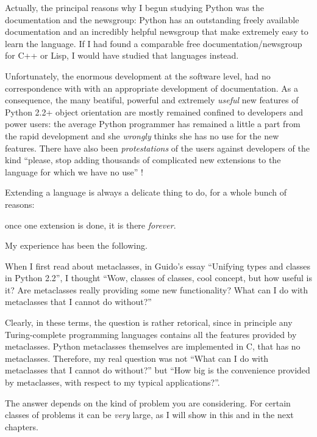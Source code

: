 \documentclass[10pt,english]{article}
\begin{document}
Actually, the principal reasons why I begun studying 
Python was the documentation and the newsgroup: Python has an outstanding 
freely available documentation and an incredibly helpful newsgroup that
make extremely easy to learn the language. If I had found a comparable 
free documentation/newsgroup for C++ or Lisp, I would have studied that
languages instead.

Unfortunately, the enormous development at the software level, had no
correspondence with with an appropriate development of documentation.
As a consequence, the many beatiful, powerful and extremely \emph{useful}
new features of Python 2.2+ object orientation are mostly remained
confined to developers and power users: the average Python programmer
has remained a little a part from the rapid development and she
\emph{wrongly} thinks she has no use for the new features. There have
also been \emph{protestations} of the users against developers of the
kind ``please, stop adding thousands of complicated new extensions
to the language for which we have no use'' !

Extending a language is always a delicate thing to do, for a whole
bunch of reasons:
\begin{list}{.}
{
\setlength{\rightmargin}{\leftmargin}
}
\item {} 
once one extension is done, it is there \emph{forever}.

\end{list}

My experience has been the following.

When I first read about metaclasses, in Guido's essay
``Unifying types and classes in Python 2.2'', I thought ``Wow,
classes of classes, cool concept, but how useful is it?  
Are metaclasses really providing some new functionality?  
What can I do with metaclasses that I cannot do without?''

Clearly, in these terms, the question is rather retorical, since in principle
any Turing-complete programming languages contains all the features provided 
by metaclasses. Python metaclasses themselves are implemented in C, that has 
no metaclasses. Therefore, my real question was not ``What can I do 
with metaclasses that I cannot do without?'' but ``How big is the convenience 
provided by metaclasses, with respect to my typical applications?''.

The answer depends on the kind of problem you are considering. For certain
classes of problems it can be \emph{very} large, as I will show in this and in
the next chapters.
\end{document}
